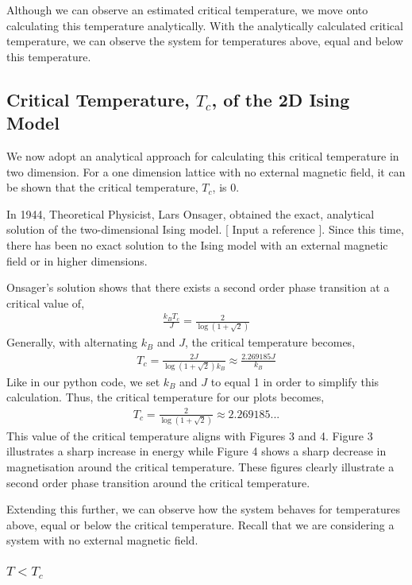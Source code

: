 \documentclass[a4paper]{article}
\begin{document}
Although we can observe an estimated critical temperature, we move onto calculating this temperature analytically. With the analytically calculated critical temperature, we can observe the system for temperatures above, equal and below this temperature.

\subsection{Critical Temperature, $T_{c}$, of the 2D Ising Model}

We now adopt an analytical approach for calculating this critical temperature in two dimension. For a one dimension lattice with no external magnetic field, it can be shown that the critical temperature, $T_{c}$, is 0. 

In 1944, Theoretical Physicist, Lars Onsager, obtained the exact, analytical solution of the two-dimensional Ising model. [ Input a reference ]. Since this time, there has been no exact solution to the Ising model with an external magnetic field or in higher dimensions.

Onsager's solution shows that there exists a second order phase transition at a critical value of,
\begin{align*}
\frac{k_{B}T_{c}}{J} = \frac{2}{\log(1 + \sqrt{2})}
\end{align*}
Generally, with alternating $k_{B}$ and $J$, the critical temperature becomes, 
\begin{align*}
T_{c} = \frac{2J}{\log(1 + \sqrt{2})k_{B}} \approx \frac{2.269185J}{k_{B}}
\end{align*}
Like in our python code, we set $k_{B}$ and $J$ to equal 1 in order to simplify this calculation. Thus, the critical temperature for our plots becomes, 
\begin{align*}
T_{c} = \frac{2}{\log(1 + \sqrt{2})} \approx 2.269185...
\end{align*}
This value of the critical temperature aligns with Figures 3 and 4. Figure 3 illustrates a sharp increase in energy while Figure 4 shows a sharp decrease in magnetisation around the critical temperature. These figures clearly illustrate a second order phase transition around the critical temperature.

Extending this further, we can observe how the system behaves for temperatures above, equal or below the critical temperature. Recall that we are considering a system with no external magnetic field.

\subsubsection{$T < T_{c}$}
\end{document}
